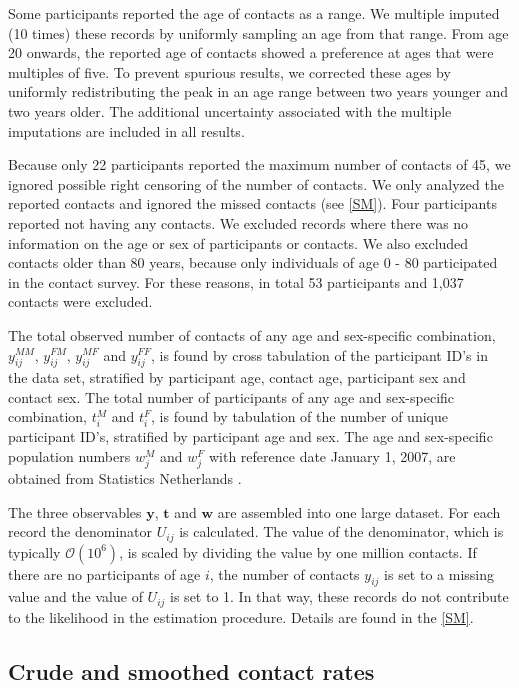 \documentclass[aoas,preprint]{imsart}
\numberwithin{equation}{section}
\begin{document}
Some participants reported the age of contacts as a range. We multiple imputed (10 times) these records by uniformly sampling an age from that range. From age 20 onwards, the reported age of contacts showed a preference at ages that were multiples of five. To prevent spurious results, we corrected these ages by uniformly redistributing the peak in an age range between two years younger and two years older. The additional uncertainty associated with the multiple imputations are included in all results.

Because only 22 participants reported the maximum number of contacts of 45, we ignored possible right censoring of the number of contacts. We only analyzed the reported contacts and ignored the missed contacts (see \ref{SM}). Four participants reported not having any contacts. We excluded records where there was no information on the age or sex of participants or contacts. We also excluded contacts older than 80 years, because only individuals of age 0 - 80 participated in the contact survey. For these reasons, in total 53 participants and 1,037 contacts were excluded.

The total observed number of contacts of any age and sex-specific combination, $y_\mathit{ij}^\mathit{MM}$, $y_\mathit{ij}^\mathit{FM}$, $y_\mathit{ij}^\mathit{MF}$ and $y_\mathit{ij}^\mathit{FF}$, is found by cross tabulation of the participant ID's in the data set, stratified by participant age, contact age, participant sex and contact sex. The total number of participants of any age and sex-specific combination, $t_i^M$ and $t_i^F$, is found by tabulation of the number of unique participant ID’s, stratified by participant age and sex. The age and sex-specific population numbers $w_j^M$ and $w_j^F$ with reference date January 1, 2007, are obtained from Statistics Netherlands \citep{statline_population_2015}.

The three observables $\bm{y}$, $\bm{t}$ and $\bm{w}$ are assembled into one large dataset. For each record the denominator $U_\mathit{ij}$ is calculated. The value of the denominator, which is typically $\mathcal{O}(10^6)$, is scaled by dividing the value by one million contacts. If there are no participants of age $i$, the number of contacts $y_\mathit{ij}$ is set to a missing value and the value of $U_\mathit{ij}$ is set to 1. In that way, these records do not contribute to the likelihood in the estimation procedure. Details are found in the \ref{SM}.

\subsection{Crude and smoothed contact rates}
\end{document}
